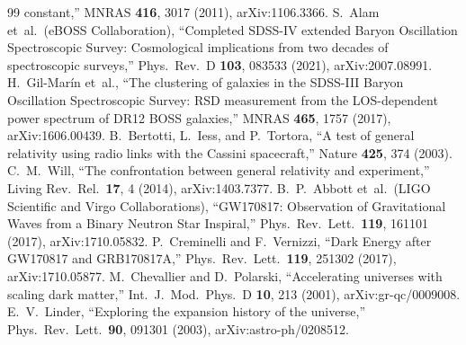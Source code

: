 \documentclass[12pt,a4paper]{article}
\begin{document}
\begin{thebibliography}{99}
    constant,''
  MNRAS \textbf{416}, 3017 (2011), arXiv:1106.3366.
  S.~Alam et~al.\ (eBOSS Collaboration),
  ``Completed SDSS-IV extended Baryon Oscillation Spectroscopic Survey:
    Cosmological implications from two decades of spectroscopic surveys,''
  Phys.\ Rev.\ D \textbf{103}, 083533 (2021), arXiv:2007.08991.
  H.~Gil-Mar\'{i}n et~al.,
  ``The clustering of galaxies in the SDSS-III Baryon Oscillation Spectroscopic
    Survey: RSD measurement from the LOS-dependent power spectrum of DR12 BOSS
    galaxies,''
  MNRAS \textbf{465}, 1757 (2017), arXiv:1606.00439.
  B.~Bertotti, L.~Iess, and P.~Tortora,
  ``A test of general relativity using radio links with the Cassini spacecraft,''
  Nature \textbf{425}, 374 (2003).
  C.~M.~Will,
  ``The confrontation between general relativity and experiment,''
  Living Rev.\ Rel.\ \textbf{17}, 4 (2014), arXiv:1403.7377.
  B.~P.~Abbott et~al.\ (LIGO Scientific and Virgo Collaborations),
  ``GW170817: Observation of Gravitational Waves from a Binary Neutron Star
    Inspiral,''
  Phys.\ Rev.\ Lett.\ \textbf{119}, 161101 (2017), arXiv:1710.05832.
  P.~Creminelli and F.~Vernizzi,
  ``Dark Energy after GW170817 and GRB170817A,''
  Phys.\ Rev.\ Lett.\ \textbf{119}, 251302 (2017), arXiv:1710.05877.
  M.~Chevallier and D.~Polarski,
  ``Accelerating universes with scaling dark matter,''
  Int.\ J.\ Mod.\ Phys.\ D \textbf{10}, 213 (2001), arXiv:gr-qc/0009008.
  E.~V.~Linder,
  ``Exploring the expansion history of the universe,''
  Phys.\ Rev.\ Lett.\ \textbf{90}, 091301 (2003), arXiv:astro-ph/0208512.
\end{thebibliography}
\end{document}
